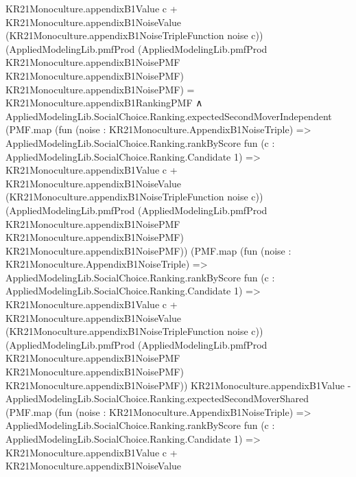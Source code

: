 \documentclass[10pt]{article}
\begin{document}
\begin{ReviewVerbatim}
                      KR21Monoculture.appendixB1Value c +
                        KR21Monoculture.appendixB1NoiseValue (KR21Monoculture.appendixB1NoiseTripleFunction noise c))
                  (AppliedModelingLib.pmfProd
                    (AppliedModelingLib.pmfProd KR21Monoculture.appendixB1NoisePMF KR21Monoculture.appendixB1NoisePMF)
                    KR21Monoculture.appendixB1NoisePMF) =
                KR21Monoculture.appendixB1RankingPMF ∧
              AppliedModelingLib.SocialChoice.Ranking.expectedSecondMoverIndependent
                      (PMF.map
                        (fun (noise : KR21Monoculture.AppendixB1NoiseTriple) =>
                          AppliedModelingLib.SocialChoice.Ranking.rankByScore
                            fun (c : AppliedModelingLib.SocialChoice.Ranking.Candidate 1) =>
                            KR21Monoculture.appendixB1Value c +
                              KR21Monoculture.appendixB1NoiseValue
                                (KR21Monoculture.appendixB1NoiseTripleFunction noise c))
                        (AppliedModelingLib.pmfProd
                          (AppliedModelingLib.pmfProd KR21Monoculture.appendixB1NoisePMF
                            KR21Monoculture.appendixB1NoisePMF)
                          KR21Monoculture.appendixB1NoisePMF))
                      (PMF.map
                        (fun (noise : KR21Monoculture.AppendixB1NoiseTriple) =>
                          AppliedModelingLib.SocialChoice.Ranking.rankByScore
                            fun (c : AppliedModelingLib.SocialChoice.Ranking.Candidate 1) =>
                            KR21Monoculture.appendixB1Value c +
                              KR21Monoculture.appendixB1NoiseValue
                                (KR21Monoculture.appendixB1NoiseTripleFunction noise c))
                        (AppliedModelingLib.pmfProd
                          (AppliedModelingLib.pmfProd KR21Monoculture.appendixB1NoisePMF
                            KR21Monoculture.appendixB1NoisePMF)
                          KR21Monoculture.appendixB1NoisePMF))
                      KR21Monoculture.appendixB1Value -
                    AppliedModelingLib.SocialChoice.Ranking.expectedSecondMoverShared
                      (PMF.map
                        (fun (noise : KR21Monoculture.AppendixB1NoiseTriple) =>
                          AppliedModelingLib.SocialChoice.Ranking.rankByScore
                            fun (c : AppliedModelingLib.SocialChoice.Ranking.Candidate 1) =>
                            KR21Monoculture.appendixB1Value c +
                              KR21Monoculture.appendixB1NoiseValue

\end{ReviewVerbatim}
\end{document}
